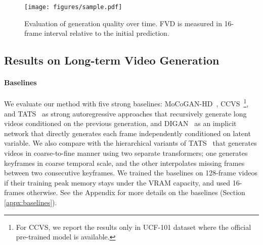 \documentclass[10pt,twocolumn,letterpaper]{article}
\newcommand{\cutparagraphup}{\vspace*{-0.1in}}
\begin{document}
\begin{figure*}[ht]
    \centering
    \texttt{[image: figures/sample.pdf]}
\vspace{-0.3cm}
    \caption{Evaluation of generation quality over time. FVD is measured in 16-frame interval relative to the initial prediction.}
\label{fig:error_propagation}
    \vspace{-0.5cm}
\end{figure*}

\subsection{Results on Long-term Video Generation}
\label{sec:exp_long_video}
\paragraph{Baselines}
We evaluate our method with five strong baselines: MoCoGAN-HD~\cite{MoCoGAN-HD}, CCVS~\cite{CCVS}\footnote{For CCVS, we report the results only in UCF-101 dataset where the official pre-trained model is available.}, and TATS~\cite{TATS} as strong autoregressive approaches that recursively generate long videos conditioned on the previous generation, and DIGAN~\cite{DIGAN} as an implicit network that directly generates each frame independently conditioned on latent variable. 
We also compare with the hierarchical variants of TATS~\cite{TATS} that generates videos in coarse-to-fine manner using two separate transformers; one generates keyframes in coarse temporal scale, and the other interpolates missing frames between two consecutive keyframes.
We trained the baselines on 128-frame videos if their training peak memory stays under the VRAM capacity, and used 16-frames otherwise.
See the Appendix for more details on the baselines (Section \ref{appx:baselines}).

\cutparagraphup
\end{document}
